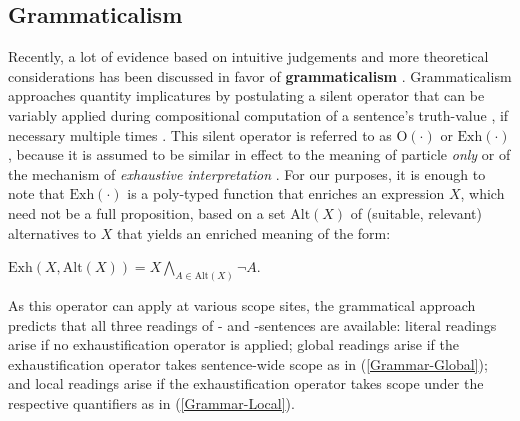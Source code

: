 \documentclass[fleqn,reqno,10pt]{article}
\newcommand{\as}{\acro{as}}
\renewcommand{\es}{\acro{es}}
\newcommand{\exh}{\ensuremath{\mathrm{Exh}}}
\newcommand{\alt}{\ensuremath{\mathrm{Alt}}}
\renewcommand{\mymark}[1]{\textbf{#1}}
\begin{document}
\subsection{Grammaticalism}
\label{sec:grammaticalism}

Recently, a lot of evidence based on intuitive judgements and more
theoretical considerations has been discussed in favor of
\mymark{grammaticalism}
\citep[see][]{Chierchia2006:Broaden-Your-Vi,Fox2007:Free-Choice-and,Magri2011:Another-Argumen,Sauerland2012:The-Computation,ChierchiaFox2008:The-Grammatical}. %
Grammaticalism approaches quantity implicatures by postulating a
silent operator that can be variably applied during compositional
computation of a sentence's truth-value
\citep{Chierchia2006:Broaden-Your-Vi}, if necessary multiple times
\citep{Fox2007:Free-Choice-and}. This silent operator is referred to
as $\mathrm{O}(\cdot)$ or $\exh(\cdot)$, because it is assumed to be
similar in effect to the meaning of particle \emph{only} or of the
mechanism of \emph{exhaustive interpretation}
\citep{GroenendijkStokhofThesis1984,Stechowvon-StechowZimmermann1984:Term-Answers-an,Rooijvan-RooijSchulz2013:Exhaustive-Inte,vanRooijSchulz:ExhaustiveInterpretation,Fox2007:Free-Choice-and}. For
our purposes, it is enough to note that $\exh(\cdot)$ is a poly-typed
function that enriches an expression $X$, which need not be a full
proposition, based on a set $\alt(X)$ of (suitable, relevant)
alternatives to $X$ that yields an enriched meaning of the
form:
\begin{exe}
  \ex \label{bsp:Exh-Def} $\exh(X,\alt(X)) = X \bigwedge_{A \in
      \alt(X)} \neg A$.
\end{exe}

As this operator can apply at various scope sites, the grammatical
approach predicts that all three readings of \as- and \es-sentences
are available: literal readings arise if no exhaustification operator
is applied; global readings arise if the exhaustification operator
takes sentence-wide scope as in (\ref{Grammar-Global}); and local
readings arise if the exhaustification operator takes scope under the
respective quantifiers as in (\ref{Grammar-Local}).
\end{document}

